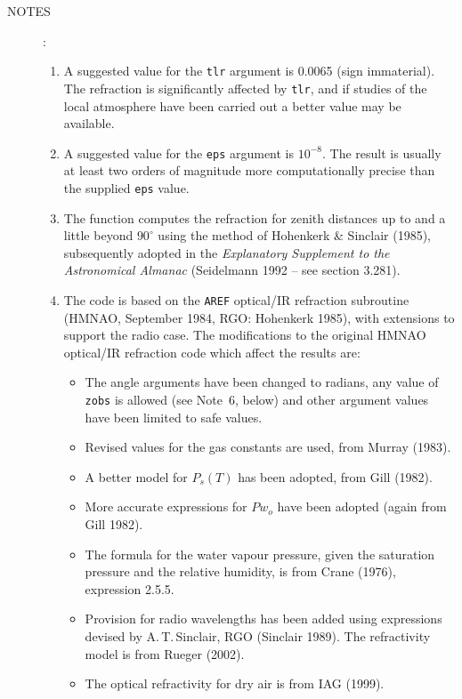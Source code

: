 \documentclass[11pt,fleqn,twoside]{article}
\renewcommand{\_}{{\tt\char'137}}     %
\newlength{\oldspacing}
\newcommand{\notes}[1]
{
  \goodbreak
  \setlength{\oldspacing}{\topsep}
  \setlength{\topsep}{0.3ex}
  \begin{description}
    \item[NOTES]:
        #1
  \end{description}
  \setlength{\topsep}{\oldspacing}
}
\begin{document}
\notes
{
 \begin{enumerate}
 \item A suggested value for the {\tt tlr} argument
       is 0.0065 (sign immaterial).
       The refraction is significantly affected by {\tt tlr},
       and if studies of the local atmosphere have been carried
       out a better value may be available.
 \item A suggested value for the {\tt eps}
       argument is $10^{-8}$.  The result is
       usually at least two orders of magnitude more computationally
       precise than the supplied {\tt eps} value.
 \item The function computes the refraction for zenith distances up
       to and a little beyond $90^\circ$ using the method of Hohenkerk
       \& Sinclair (1985), subsequently adopted in the {\it Explanatory
       Supplement to the Astronomical Almanac}\/
       (Seidelmann 1992 -- see section 3.281).
 \item The code is based on the {\tt AREF}
       optical/IR refraction subroutine
       (HMNAO, September 1984, RGO: Hohenkerk 1985),
       with extensions to
       support the radio case.  The modifications to the original HMNAO
       optical/IR refraction code which affect the results are:
       \begin{itemize}
        \item The angle arguments have been changed to radians,
              any value of {\tt zobs} is allowed (see Note~6, below) and
              other argument values have been limited to safe values.
        \item Revised values for the gas constants are used, from
              Murray (1983).
        \item A better model for $P_s(T)$ has been adopted,
              from Gill (1982).
        \item More accurate expressions for $Pw_o$ have been adopted
              (again from Gill 1982).
        \item The formula for the water vapour pressure, given the
              saturation pressure and the relative humidity, is from
              Crane (1976), expression 2.5.5.
        \item Provision for radio wavelengths has been added using
              expressions devised by A.\,T.\,Sinclair, RGO
              (Sinclair 1989).  The refractivity model
              is from Rueger (2002).
        \item The optical refractivity for dry air is from IAG (1999).

\end{itemize}
\end{enumerate}}
\end{document}
